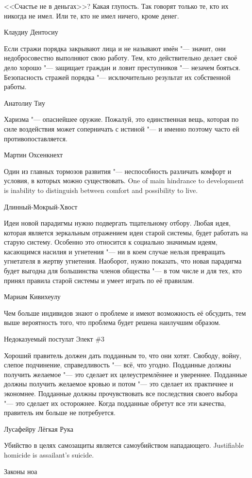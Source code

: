 \epigraph
{<<Счастье не в деньгах>>?
Какая глупость.
Так говорят только те, кто их никогда не имел.
Или те, кто не имел ничего, кроме денег.}
{Клаудиу Дентосиу}

\epigraph
{Если стражи порядка закрывают лица и не называют имён "--- значит, они недобросовестно выполняют свою работу.
Тем, кто действительно делает своё дело хорошо "--- защищает граждан и ловит преступников "--- незачем бояться.
Безопасность стражей порядка "--- исключительно результат их собственной работы.}
{Анатолиу Тиу}

\epigraph
{Харизма "--- опаснейшее оружие.
Пожалуй, это единственная вещь, которая по силе воздействия может соперничать с истиной "--- и именно поэтому часто ей противопоставляется.}
{Мартин Охсенкнехт}

\epigraph{
{Один из главных тормозов развития "--- неспособность различать комфорт и условия, в которых можно существовать.}
{One of main hindrance to development is inability to distinguish between comfort and possibility to live.}
}{Длинный-Мокрый-Хвост}

\epigraph
{Идеи новой парадигмы нужно подвергать тщательному отбору.
Любая идея, которая является зеркальным отражением идеи старой системы, будет работать на старую систему.
Особенно это относится к социально значимым идеям, касающимся насилия и угнетения "--- ни в коем случае нельзя превращать угнетателя в жертву угнетения.
Наоборот, нужно показать, что новая парадигма будет выгодна для большинства членов общества "--- в том числе и для тех, кто принял правила старой системы и умеет играть по её правилам.}
{Мариам Кивихеулу}

\epigraph
{Чем больше индивидов знают о проблеме и имеют возможность её обсудить, тем выше вероятность того, что проблема будет решена наилучшим образом.}
{Недоказуемый постулат Элект \#3}

\epigraph
{Хороший правитель должен дать подданным то, что они хотят.
Свободу, войну, слепое подчинение, справедливость "--- всё, что угодно.
Подданные должны получить желаемое "--- это сделает их целеустремлённее и увереннее.
Подданные должны получить желаемое кровью и потом "--- это сделает их практичнее и экономнее.
Подданные должны прочувствовать все последствия своего выбора "--- это сделает их осторожнее.
Когда подданные обретут все эти качества, правитель им больше не потребуется.}
{Лусафейру Лёгкая Рука}

\epigraph{
{Убийство в целях самозащиты является самоубийством нападающего.}
{Justifiable homicide is assailant's suicide.}
}{Законы ноа}

